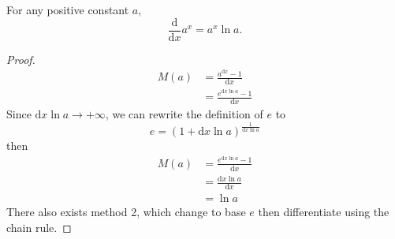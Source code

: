 \begin{enumerate}
        For any positive constant $a$,
        $$
        \frac{\mathrm{d}}{\mathrm{d}x}a^x=a^x\ln a.
        $$
        \begin{proof}
            \begin{align*}
                M(a) & =\frac{a^{\mathrm{d}x}-1}{\mathrm{d}x} \\
                     & =\frac{e^{\mathrm{d}x\ln a}-1}{\mathrm{d}x}
            \end{align*}
            Since $\mathrm{d}x\ln a\to+\infty$, we can rewrite the definition of $e$ to
            $$
            e=(1+\mathrm{d}x\ln a)^\frac{1}{\mathrm{d}x\ln a}
            $$
            then
            \begin{align*}
                M(a) & =\frac{e^{\mathrm{d}x\ln a}-1}{\mathrm{d}x} \\
                     & =\frac{\mathrm{d}x\ln a}{\mathrm{d}x} \\
                     & =\ln a
            \end{align*}
            There also exists method 2, which change to base $e$ then differentiate using the chain rule.
        \end{proof}
\end{enumerate}

